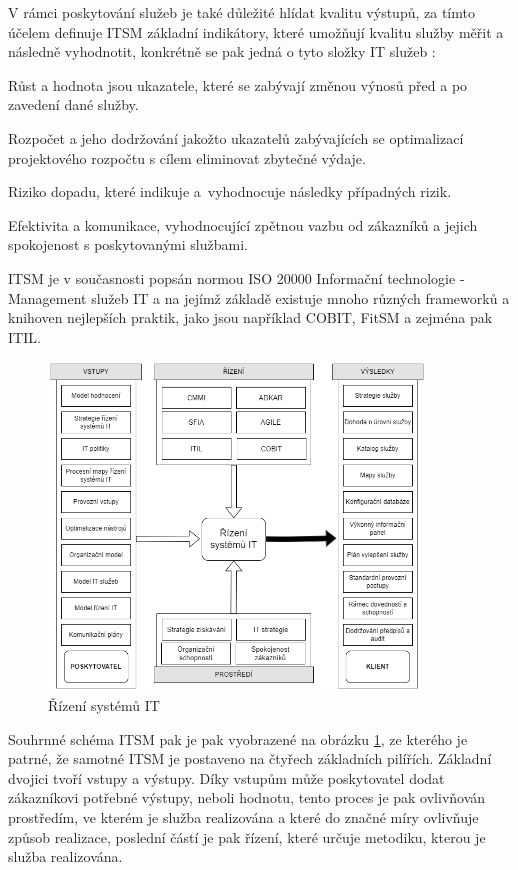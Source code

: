 \documentclass[
  digital,     %
  twoside,     %
  lof,         %
  lot,         %
]{fithesis4}
\begin{document}
V rámci poskytování služeb je také důležité hlídat kvalitu výstupů, za tímto účelem definuje ITSM základní indikátory, které umožňují kvalitu služby měřit a následně vyhodnotit, konkrétně se pak jedná o tyto složky IT služeb \parencite[s.~20]{Matula2017}:
\begin{compactitem}
\item Růst a hodnota jsou ukazatele, které se zabývají změnou výnosů před a po zavedení dané služby.
\item Rozpočet a jeho dodržování jakožto ukazatelů zabývajících se optimalizací projektového rozpočtu s cílem eliminovat zbytečné výdaje.
\item Riziko dopadu, které indikuje a vyhodnocuje následky případných rizik.
\item Efektivita a komunikace, vyhodnocující zpětnou vazbu od zákazníků a jejich spokojenost s poskytovanými službami.
\end{compactitem}

ITSM je v současnosti popsán normou ISO 20000 Informační technologie - Management služeb IT a na jejímž základě existuje mnoho různých frameworků a knihoven nejlepších praktik, jako jsou například COBIT, FitSM a zejména pak ITIL.\parencite[s.~25]{Matula2017}

\begin{figure}[h]
  \begin{center}
          \includegraphics[width=10cm]{img/itsm-diag.drawio.png}
  \end{center}
  \caption{Řízení systémů IT \parencite[s.~21]{Matula2017}}
  \label{fig:itsmDiag}
\end{figure} 

Souhrnné schéma ITSM pak je pak vyobrazené na obrázku \ref{fig:itsmDiag}, ze kterého je patrné, že samotné ITSM je postaveno na čtyřech základních pilířích. Základní dvojici tvoří vstupy a výstupy. Díky vstupům může poskytovatel dodat zákazníkovi potřebné výstupy, neboli hodnotu, tento proces je pak ovlivňován prostředím, ve kterém je služba realizována a které do značné míry ovlivňuje způsob realizace, poslední částí je pak řízení, které určuje metodiku, kterou je služba realizována. 
\end{document}
